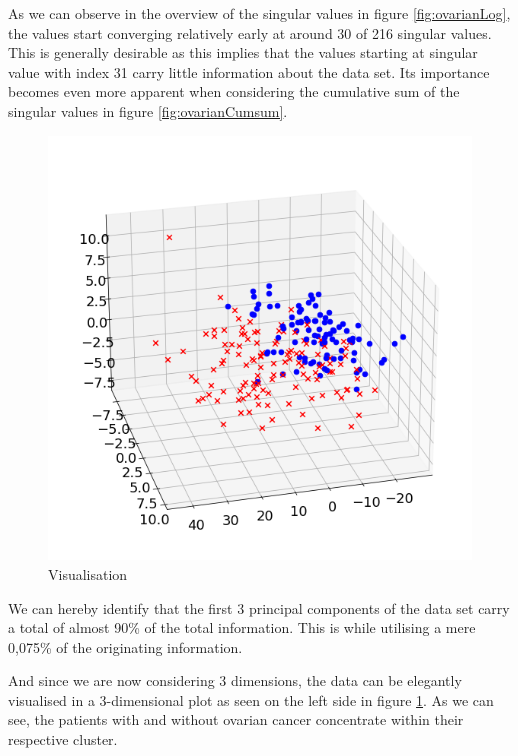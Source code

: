 As we can observe in the overview of the singular values in figure \ref{fig:ovarianLog}, the values start converging relatively early at around 30 of 216 singular values.
This is generally desirable as this implies that the values starting at singular value with index 31 carry little information about the data set.
Its importance becomes even more apparent when considering the cumulative sum of the singular values in figure \ref{fig:ovarianCumsum}.


\begin{figure}
    \centering
    \includegraphics[width=0.94\linewidth]{external_content/media/ovarian_cancer/visualisation.png}
    \captionsetup{justification=centering}
    \caption{Visualisation}
    \label{fig:visualisation}
\end{figure}

\noindent
We can hereby identify that the first 3 principal components of the data set carry a total of almost 90\% of the total information.
This is while utilising a mere 0,075\% of the originating information.

And since we are now considering 3 dimensions, the data can be elegantly visualised in a 3-dimensional plot as seen on the left side in figure \ref{fig:visualisation}.
As we can see, the patients with and without ovarian cancer concentrate within their respective cluster.



